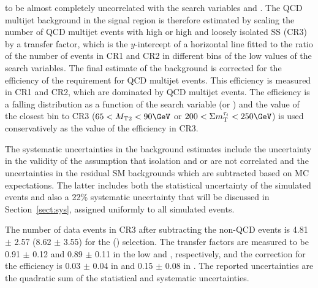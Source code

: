 to be almost completely uncorrelated with the search variables \mttwo and \SumMT.
The QCD multijet background in the signal region is therefore estimated by scaling the number of QCD multijet events with high \mttwo or high \SumMT and loosely isolated SS \tauTau (CR3) by a transfer factor, %
which is the $y$-intercept of a horizontal line fitted to the ratio of the number of events in CR1 and CR2 in different bins of the low values of the search variables.
The final estimate of the background 
is corrected for the efficiency of 
the \deltaphi requirement for QCD multijet events. This efficiency is measured in CR1 and CR2, 
which are dominated by QCD multijet events. The efficiency is a falling distribution as a function of 
the search variable (\mttwo or \SumMT)
and the value of the closest bin to CR3 ($65<\mttwo<90\GeV$ or $200<\SumMT<250\GeV$) is used conservatively as the 
value of the efficiency in CR3.

The systematic uncertainties in the background estimates include the uncertainty in the validity of the assumption that isolation and \mttwo or \SumMT are not correlated and the uncertainties in the residual 
SM backgrounds which  are subtracted based on MC expectations. 
The latter includes both the statistical uncertainty of the simulated 
events and also a 22\% systematic uncertainty that will be discussed in Section~\ref{sect:sys}, 
assigned uniformly to all simulated events.

The number of data events in CR3 after subtracting the non-QCD events is 4.81 $\pm$ 2.57 (8.62 $\pm$ 3.55) for the \binone (\bintwo) selection.
The transfer factors are measured to be 0.91 $\pm$ 0.12 and 0.89 $\pm$ 0.11 in the low \mttwo and \SumMT, respectively, and 
the correction for the \deltaphi efficiency is 0.03 $\pm$ 0.04 in \binone and 0.15 $\pm$ 0.08 in \bintwo. 
The reported uncertainties are the quadratic sum of the statistical and systematic uncertainties.

